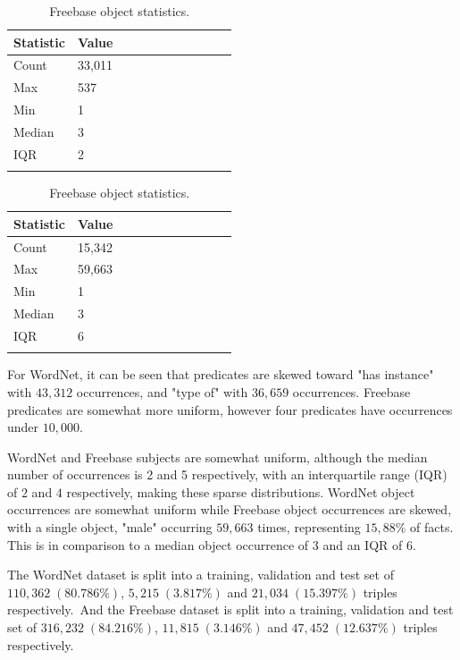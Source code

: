\begin{table}[H]
	\parbox{.5\linewidth}{
		\centering
		\begin{tabular}{lllllllllll}
  			\textbf{Statistic} & \textbf{Value}  \\
  			\hline
			Count & 33,011 \\
			Max & 537 \\
			Min & 1 \\
  			Median & 3 \\
  			IQR & 2 \\
				&
		\end{tabular}
		\caption{WordNet object statistics.}
		}
	\hfill
	\parbox{.5\linewidth}{
		\centering
		\begin{tabular}{lllllllllll}
  			\textbf{Statistic} & \textbf{Value}  \\
  			\hline
			Count & 15,342 \\
			Max & 59,663 \\
			Min & 1 \\
  			Median & 3 \\
  			IQR & 6 \\
				&
		\end{tabular}
		\caption{Freebase object statistics.}
		}
\end{table}

\noindent For WordNet, it can be seen that predicates are skewed toward "has instance" with $ 43, 312 $ occurrences, and "type of" with $ 36, 659 $ occurrences. Freebase predicates are somewhat more uniform, however four predicates have occurrences under $ 10, 000 $. \par

\noindent WordNet and Freebase subjects are somewhat uniform, although the median number of occurrences is 2 and 5 respectively, with an interquartile range (IQR) of $ 2 $ and $ 4 $ respectively, making these sparse distributions. WordNet object occurrences are somewhat uniform while Freebase object occurrences are skewed, with a single object, "male" occurring $ 59, 663 $ times, representing $15, 88\% $ of facts. This is in comparison to a median object occurrence of $ 3 $ and an IQR of $ 6 $. \par

\noindent The WordNet dataset is split into a training, validation and test set of $ 110, 362 \; (80.786 \%) $, $ 5, 215 \; (3.817 \%) $ and $ 21, 034 \; (15.397 \%) $ triples respectively.\ And the Freebase dataset is split into a training, validation and test set of $ 316, 232 \; (84.216 \%) $, $ 11, 815 \; (3.146 \%) $ and $ 47, 452 \; (12.637 \%) $ triples respectively. 


